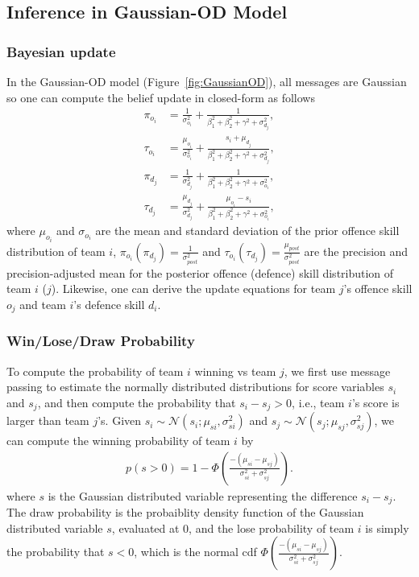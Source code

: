 \subsection{Inference in Gaussian-OD Model}

\subsubsection{Bayesian update} 
In the Gaussian-OD model (Figure~\ref{fig:GaussianOD}), all
messages are Gaussian so one can
compute the belief update in closed-form as follows
\begin{align}
\label{eq:GaussianGraphicalModelsUpdatingEquation}
  \pi_{o_{i}}     &=    \frac{1}{\sigma_{o_{i}}^2} + \frac{1}{\beta_1^2+\beta_2^2+\gamma^2+\sigma_{d_{j}}^2},  \nonumber \\
  \tau_{o_{i}}    &=    \frac{\mu_{o_{i}}}{\sigma_{o_{i}}^2} + \frac{s_i+\mu_{d_{j}}}{\beta_1^2+\beta_2^2+\gamma^2+\sigma_{d_{j}}^2},  \nonumber \\
  \pi_{d_{j}}     &=    \frac{1}{\sigma_{d_{j}}^2} + \frac{1}{\beta_1^2+\beta_2^2+\gamma^2+\sigma_{o_{i}}^2}, \nonumber \\ 
  \tau_{d_{j}}    &=    \frac{\mu_{d_{j}}}{\sigma_{d_{j}}^2} + \frac{\mu_{o_{i}}-s_i}{\beta_1^2+\beta_2^2+\gamma^2+\sigma_{o_{i}}^2},
\end{align}
\unindentmore where $\mu_{o_{i}}$ and $\sigma_{o_{i}}$ are the mean
and standard deviation of the prior offence skill distribution of team
$i$, $\pi_{o_{i}} (\pi_{d_{j}}) = \frac{1}{\sigma_{\mathit{post}}^2}$
and $\tau_{o_{i}} (\tau_{d_{j}}) =
\frac{\mu_{\mathit{post}}}{\sigma_{\mathit{post}}^2}$ are the
precision and precision-adjusted mean for the posterior offence
(defence) skill distribution of team $i$ ($j$).  Likewise, one can
derive the update equations for team $j$'s offence skill $o_j$ and
team $i$'s defence skill $d_i$.

\subsubsection{Win/Lose/Draw Probability} 
To compute the probability of team $i$ winning vs team $j$, we first use message
passing to estimate the normally distributed distributions for score
variables $s_i$ and $s_j$, and then compute the probability that
$s_i-s_j>0$, i.e., team $i$'s score is larger than team $j$'s. Given
$s_i\sim\mathcal{N}(s_i;\mu_{si},\sigma_{si}^2)$ and
$s_j\sim\mathcal{N}(s_j;\mu_{sj},\sigma_{sj}^2)$, we can compute the
winning probability of team $i$ by
\begin{align}
  p(s>0) = 1 - \Phi\left(\frac{-(\mu_{si}-\mu_{sj})}{\sigma_{si}^2+\sigma_{sj}^2}\right).
\end{align}
where $s$ is the Gaussian distributed variable representing the difference $s_i-s_j$. The draw probability is the probaiblity density function of the Gaussian distributed variable $s$, evaluated at 0, and the lose probability of team $i$ is simply the probability that $s<0$, which is the normal cdf $\Phi\left(\frac{-(\mu_{si}-\mu_{sj})}{\sigma_{si}^2+\sigma_{sj}^2}\right)$. 

